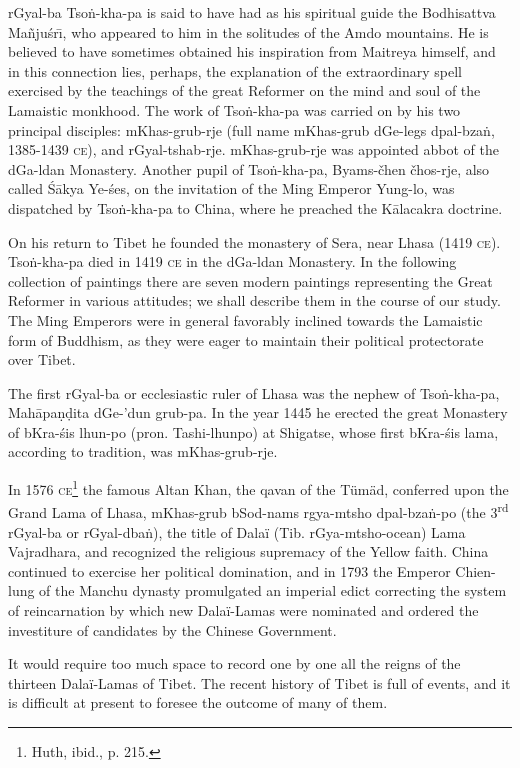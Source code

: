 \documentclass[a4paper, 12pt, oneside]{article}
\begin{document}
rGyal-ba Tso\.{n}-kha-pa is said to have had as his spiritual guide the Bodhisattva Ma\~{n}ju\'{s}r\={\i}, who appeared to him in the solitudes of the Amdo mountains. He is believed to have sometimes obtained his inspiration from Maitreya himself, and in this connection lies, perhaps, the explanation of the extraordinary spell exercised by the teachings of the great Reformer on the mind and soul of the Lamaistic monkhood. The work of Tso\.{n}-kha-pa was carried on by his two principal disciples: mKhas-grub-rje (full name mKhas-grub dGe-legs dpal-bza\.{n}, 1385-1439 \textsc{ce}), and rGyal-tshab-rje. mKhas-grub-rje was appointed abbot of the dGa-ldan Monastery. Another pupil of Tso\.{n}-kha-pa, Byams-čhen čhos-rje, also called \'{S}\={a}kya Ye-\'{s}es, on the invitation of the Ming Emperor Yung-lo, was dispatched by Tso\.{n}-kha-pa to China, where he preached the K\={a}lacakra doctrine.

On his return to Tibet he founded the monastery of Sera, near Lhasa (1419 \textsc{ce}). Tso\.{n}-kha-pa died in 1419 \textsc{ce} in the dGa-ldan Monastery. In the following collection of paintings there are seven modern paintings representing the Great Reformer in various attitudes; we shall describe them in the course of our study. The Ming Emperors were in general favorably inclined towards the Lamaistic form of Buddhism, as they were eager to maintain their political protectorate over Tibet.

The first rGyal-ba or ecclesiastic ruler of Lhasa was the nephew of Tso\.{n}-kha-pa, Mah\={a}pa\d{n}\d{d}ita dGe-'dun grub-pa. In the year 1445 he erected the great Monastery of bKra-\'{s}is lhun-po (pron. Tashi-lhunpo) at Shigatse, whose first bKra-\'{s}is lama, according to tradition, was mKhas-grub-rje.

In 1576 \textsc{ce}\footnote{Huth, ibid., p. 215.} the famous Altan Khan, the qavan of the Tümäd, conferred upon the Grand Lama of Lhasa, mKhas-grub bSod-nams rgya-mtsho dpal-bza\.{n}-po (the 3\textsuperscript{rd} rGyal-ba or rGyal-dba\.{n}), the title of Dalaï (Tib. rGya-mtsho-ocean) Lama Vajradhara, and recognized the religious supremacy of the Yellow faith. China continued to exercise her political domination, and in 1793 the Emperor Chien-lung of the Manchu dynasty promulgated an imperial edict correcting the system of reincarnation by which new Dalaï-Lamas were nominated and ordered the investiture of candidates by the Chinese Government.

It would require too much space to record one by one all the reigns of the thirteen Dalaï-Lamas of Tibet. The recent history of Tibet is full of events, and it is difficult at present to foresee the outcome of many of them.
\end{document}
